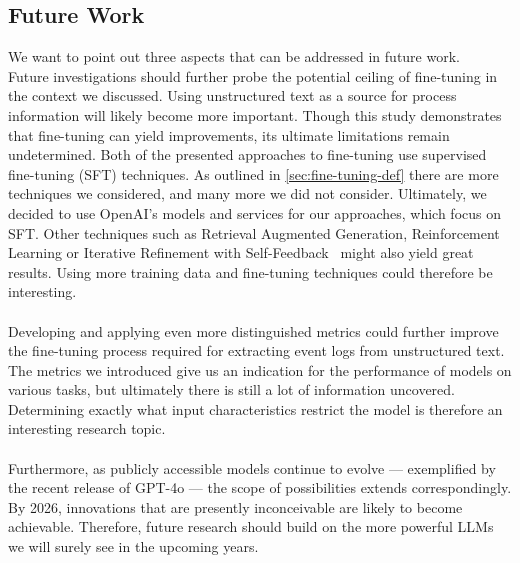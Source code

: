 \subsection{Future Work}\label{sec:future_work}
We want to point out three aspects that can be addressed in future work.\\
Future investigations should further probe the potential ceiling of fine-tuning in the context we discussed. Using unstructured text as a source for process information will likely become more important. Though this study demonstrates that fine-tuning can yield improvements, its ultimate limitations remain undetermined. Both of the presented approaches to fine-tuning use supervised fine-tuning (SFT) techniques. As outlined in \autoref{sec:fine-tuning-def} there are more techniques we considered, and many more we did not consider. Ultimately, we decided to use OpenAI's models and services for our approaches, which focus on SFT. Other techniques such as Retrieval Augmented Generation, Reinforcement Learning\cite{ovadia_fine-tuning_2024} or Iterative Refinement with Self-Feedback~\cite{madaan_self-refine_2023} might also yield great results. 
Using more training data and fine-tuning techniques could therefore be interesting.\\\\
Developing and applying even more distinguished metrics could further improve the fine-tuning process required for extracting event logs from unstructured text. The metrics we introduced give us an indication for the performance of models on various tasks, but ultimately there is still a lot of information uncovered. Determining exactly what input characteristics restrict the model is therefore an interesting research topic.\\\\
Furthermore, as publicly accessible models continue to evolve — exemplified by the recent release of GPT-4o — the scope of possibilities extends correspondingly. By 2026, innovations that are presently inconceivable are likely to become achievable. Therefore, future research should build on the more powerful LLMs we will surely see in the upcoming years.
